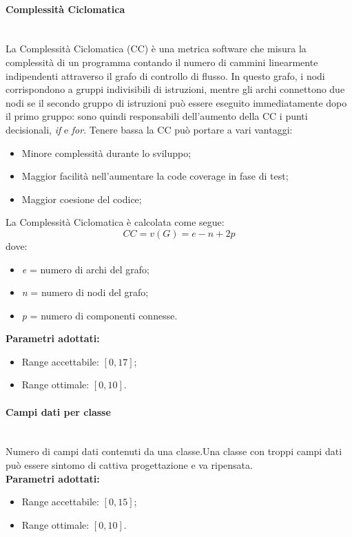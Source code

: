 \paragraph{Complessità Ciclomatica}\mbox{}\\[0,3cm]
La Complessità Ciclomatica (CC) è una metrica software che misura la complessità di un programma contando il numero di cammini linearmente indipendenti attraverso il grafo di controllo di flusso. In questo grafo, i nodi corrispondono a gruppi indivisibili di istruzioni, mentre gli archi connettono due nodi se il secondo gruppo di istruzioni può essere eseguito immediatamente dopo il primo gruppo: sono quindi responsabili dell'aumento della CC i punti decisionali, \emph{if} e \emph{for}.
Tenere bassa la CC può portare a vari vantaggi:
\begin{itemize}
	\item Minore complessità durante lo sviluppo;
	\item Maggior facilità nell'aumentare la code coverage in fase di test;
	\item Maggior coesione del codice;
\end{itemize}
La Complessità Ciclomatica è calcolata come segue:
\[
CC = v(G) = e - n + 2p
\]
dove:
\begin{itemize}
	\item \emph{e} = numero di archi del grafo;
	\item \emph{n} = numero di nodi del grafo;
	\item \emph{p} = numero di componenti connesse.
\end{itemize}
\textbf{Parametri adottati:}
\begin{itemize}
	\item Range accettabile: $[0,17]$;
	\item Range ottimale: $[0,10]$.
\end{itemize}

\paragraph{Campi dati per classe}\mbox{}\\[0,3cm]
Numero di campi dati contenuti da una classe.Una classe con troppi campi dati può essere sintomo di cattiva progettazione e va ripensata.\\[0,2cm]
\textbf{Parametri adottati:}
\begin{itemize}
	\item Range accettabile: $[0,15]$;
	\item Range ottimale: $[0,10]$.
\end{itemize}

